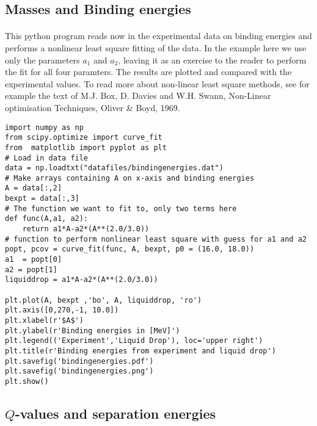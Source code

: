 \documentclass[%
twoside,                 %
final,                   %
10pt]{article}
\begin{document}
\subsection*{Masses and Binding energies}

\paragraph{}
This  python program reads now in the experimental data on binding energies and performs a nonlinear least square fitting of the data. In the example here we use only the parameters $a_1$ and $a_2$, leaving it as an exercise to the reader to perform the fit for all four paramters. The results are plotted and compared with the experimental values.  To read more about non-linear least square methods, see for example the text of M.J. Box, D. Davies and W.H. Swann, Non-Linear optimisation Techniques, Oliver {\&} Boyd, 1969.
\begin{verbatim}
import numpy as np
from scipy.optimize import curve_fit
from  matplotlib import pyplot as plt
# Load in data file
data = np.loadtxt("datafiles/bindingenergies.dat")
# Make arrays containing A on x-axis and binding energies
A = data[:,2]
bexpt = data[:,3]
# The function we want to fit to, only two terms here
def func(A,a1, a2):
    return a1*A-a2*(A**(2.0/3.0))
# function to perform nonlinear least square with guess for a1 and a2
popt, pcov = curve_fit(func, A, bexpt, p0 = (16.0, 18.0))
a1  = popt[0]
a2 = popt[1]
liquiddrop = a1*A-a2*(A**(2.0/3.0))

plt.plot(A, bexpt ,'bo', A, liquiddrop, 'ro')
plt.axis([0,270,-1, 10.0])
plt.xlabel(r'$A$')
plt.ylabel(r'Binding energies in [MeV]')
plt.legend(('Experiment','Liquid Drop'), loc='upper right')
plt.title(r'Binding energies from experiment and liquid drop')
plt.savefig('bindingenergies.pdf')
plt.savefig('bindingenergies.png')
plt.show()
\end{verbatim}






\subsection*{$Q$-values and separation energies}

\end{document}

